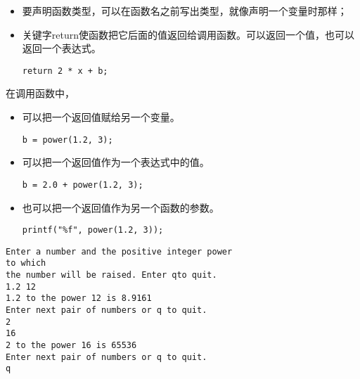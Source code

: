 \begin{frame}[fragile]\ft{\secname}
\begin{itemize}
\item 要声明函数类型，可以在函数名之前写出类型，就像声明一个变量时那样；\\[0.1in]
\item 关键字return使函数把它后面的值返回给调用函数。可以返回一个值，也可以返回一个表达式。
\begin{lstlisting}
return 2 * x + b;
\end{lstlisting}
\end{itemize}
\end{frame}


\begin{frame}[fragile]\ft{\secname}
在调用函数中，\vspace{0.1in}

\begin{itemize}
\item 可以把一个返回值赋给另一个变量。
\begin{lstlisting}
b = power(1.2, 3);
\end{lstlisting}
\item 可以把一个返回值作为一个表达式中的值。
\begin{lstlisting}
b = 2.0 + power(1.2, 3);
\end{lstlisting}
\item 也可以把一个返回值作为另一个函数的参数。
\begin{lstlisting}
printf("%f", power(1.2, 3));
\end{lstlisting}
\end{itemize}
\end{frame}

\begin{frame}

\end{frame}


\begin{frame}[fragile]
\begin{lstlisting}[backgroundcolor=\color{red!10}]
Enter a number and the positive integer power
to which
the number will be raised. Enter qto quit.
1.2 12
1.2 to the power 12 is 8.9161
Enter next pair of numbers or q to quit.
2
16
2 to the power 16 is 65536
Enter next pair of numbers or q to quit.
q
\end{lstlisting}

\end{frame}
